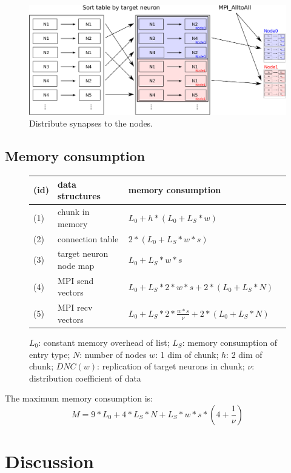 \documentclass[a4paper]{article}
\begin{document}
\begin{figure}[ht!]
\centering
\includegraphics[scale=0.7]{sort_table_all_alltoall.eps}
\caption{Distribute synapses to the nodes.}
\end{figure}

\subsection{Memory consumption}
\begin{figure}[ht!]
\begin{tabular}{| l | l | l | l |}
    \hline
    (id) & data structures & memory consumption \\ \hline
    (1) & chunk in memory & $L_0 + h*(L_0 + L_S*w)$ \\ \hline
    (2) & connection table & $2*(L_0+L_S*w*s)$ \\ \hline
    (3) & target neuron node map & $L_0+L_S*w*s$ \\ \hline
    (4) & MPI send vectors & $L_0+L_S*2*w*s+2*(L_0+L_S*N)$ \\ \hline
    (5) & MPI recv vectors & $L_0+L_S*2*\frac{w*s}{\nu}+2*(L_0+L_S*N)$ \\ \hline
    \end{tabular}
\caption{$L_0$: constant memory overhead of list; $L_S$: memory consumption of entry type; $N$: number of nodes $w$: 1 dim of chunk; $h$: 2 dim of chunk; $DNC(w)$: replication of target neurons in chunk; $\nu$: distribution coefficient of data}
\end{figure}
The maximum memory consumption is:
\begin{equation}
  M = 9*L_0 + 4*L_S*N+L_S*w*s*(4+\frac{1}{\nu})
  \label{eq:maxmemoryconsumption}
\end{equation}

\newpage
\section{Discussion}
\end{document}
